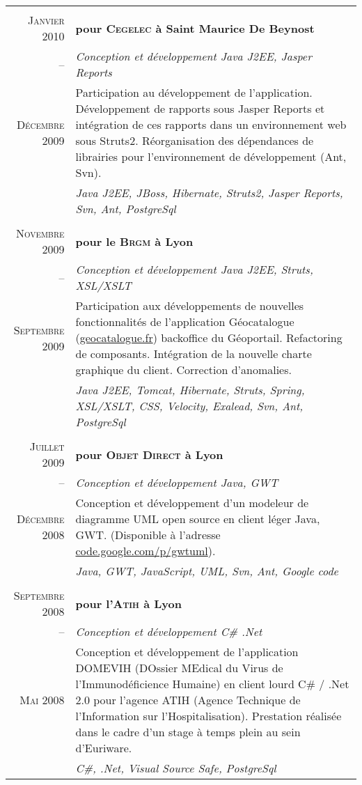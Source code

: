 \documentclass[a4paper,10pt]{article}
\begin{document}
\begin{supertabular}{r|p{11cm}}
   \\
  \textsc{Janvier} 2010 & \textbf{pour \textsc{Cegelec} à Saint Maurice De Beynost} \\
  -- & \emph{Conception et développement Java J2EE, Jasper Reports} \\
  \footnotesize{\textsc{Décembre 2009}}  & \footnotesize{Participation au développement de l’application. Développement de rapports sous Jasper Reports et intégration de ces rapports dans un environnement web sous Struts2. Réorganisation des dépendances de librairies pour l’environnement de développement (Ant, Svn).} \\
  & \emph{Java J2EE, JBoss, Hibernate, Struts2, Jasper Reports, Svn, Ant, PostgreSql} \\


   \\
  \textsc{Novembre} 2009 & \textbf{pour le \textsc{Brgm} à Lyon} \\
  -- & \emph{Conception et développement Java J2EE, Struts, XSL/XSLT} \\
  \footnotesize{\textsc{Septembre 2009}} & \footnotesize{Participation aux développements de nouvelles fonctionnalités de l’application Géocatalogue (\href{http://www.geocatalogue.fr}{geocatalogue.fr}) backoffice du Géoportail. Refactoring de composants. Intégration de la nouvelle charte graphique du client. Correction d’anomalies.} \\
  & \emph{Java J2EE, Tomcat, Hibernate, Struts, Spring, XSL/XSLT, CSS, Velocity, Exalead, Svn, Ant, PostgreSql} \\


   \\
  \textsc{Juillet} 2009 & \textbf{pour \textsc{Objet Direct} à Lyon} \\
  -- & \emph{Conception et développement Java, GWT} \\
  \footnotesize{\textsc{Décembre} 2008}& \footnotesize{Conception et développement d’un modeleur de diagramme UML open source en client léger Java, GWT. (Disponible à l’adresse \href{http://code.google.com/p/gwtuml/}{code.google.com/p/gwtuml}).} \\
  & \emph{Java, GWT, JavaScript, UML, Svn, Ant, Google code} \\


   \\
  \textsc{Septembre} 2008 & \textbf{pour l’\textsc{Atih} à Lyon} \\
  -- & \emph{Conception et développement C\# .Net} \\
  \footnotesize{\textsc{Mai} 2008} & \footnotesize{Conception et développement de l’application DOMEVIH (DOssier MEdical du Virus de l’Immunodéficience Humaine) en client lourd C\# / .Net 2.0 pour l’agence ATIH (Agence Technique de l’Information sur l’Hospitalisation). Prestation réalisée dans le cadre d’un stage à temps plein au sein d’Euriware.} \\
  & \emph{C\#, .Net, Visual Source Safe, PostgreSql} \\



\end{supertabular}
\end{document}

